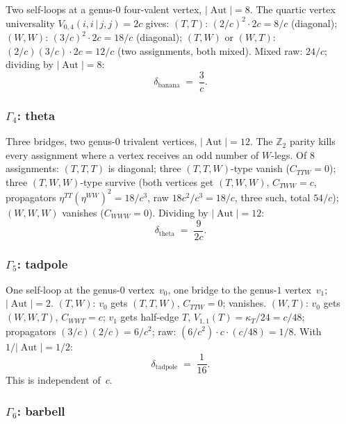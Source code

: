 \documentclass[11pt,reqno]{amsart}
\theoremstyle{definition}
\theoremstyle{remark}
\DeclareMathOperator{\Aut}{Aut}
\numberwithin{equation}{section}
\begin{document}
Two self-loops at a genus-$0$ four-valent vertex,
$|\Aut| = 8$. The quartic vertex universality
$V_{0,4}(i,i\,|\,j,j) = 2c$ gives:
$(T,T)$: $(2/c)^2 \cdot 2c = 8/c$ (diagonal);
$(W,W)$: $(3/c)^2 \cdot 2c = 18/c$ (diagonal);
$(T,W)$ or $(W,T)$:
$(2/c)(3/c) \cdot 2c = 12/c$ (two assignments, both
mixed).
Mixed raw: $24/c$; dividing by $|\Aut| = 8$:
\begin{equation}\label{eq:banana-cross}
 \delta_{\mathrm{banana}} \;=\; \frac{3}{c}.
\end{equation}

\subsubsection*{$\Gamma_4$: theta}

Three bridges, two genus-$0$ trivalent vertices,
$|\Aut| = 12$. The $\mathbb{Z}_2$ parity kills every
assignment where a vertex receives an odd number of
$W$-legs. Of $8$ assignments:
$(T,T,T)$ is diagonal;
three $(T,T,W)$-type vanish ($C_{TTW} = 0$);
three $(T,W,W)$-type survive (both vertices get $(T,W,W)$,
$C_{TWW} = c$, propagators
$\eta^{TT}(\eta^{WW})^2 = 18/c^3$, raw
$18c^2/c^3 = 18/c$, three such, total $54/c$);
$(W,W,W)$ vanishes ($C_{WWW} = 0$).
Dividing by $|\Aut| = 12$:
\begin{equation}\label{eq:theta-cross}
 \delta_{\mathrm{theta}} \;=\; \frac{9}{2c}.
\end{equation}

\subsubsection*{$\Gamma_5$: tadpole}

One self-loop at the genus-$0$ vertex~$v_0$, one bridge
to the genus-$1$ vertex~$v_1$; $|\Aut| = 2$.
$(T,W)$: $v_0$ gets $(T,T,W)$, $C_{TTW} = 0$; vanishes.
$(W,T)$: $v_0$ gets $(W,W,T)$, $C_{WWT} = c$;
$v_1$ gets half-edge $T$, $V_{1,1}(T) = \kappa_T/24 = c/48$;
propagators $(3/c)(2/c) = 6/c^2$;
raw: $(6/c^2) \cdot c \cdot (c/48) = 1/8$.
With $1/|\Aut| = 1/2$:
\begin{equation}\label{eq:tadpole-cross}
 \delta_{\mathrm{tadpole}} \;=\; \frac{1}{16}.
\end{equation}
This is independent of~$c$.

\subsubsection*{$\Gamma_6$: barbell}
\end{document}

